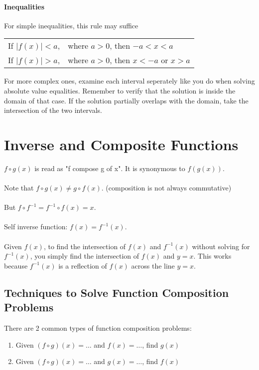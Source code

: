 \documentclass{article}
\numberwithin{equation}{section}
\begin{document}
\paragraph{Inequalities}

For simple inequalities, this rule may suffice

\medskip

\begin{tabular}{l l}
	If $|f(x)| < a$, &where $a>0$, then $-a<x<a$ \\
	If $|f(x)| > a$, &where $a>0$, then $x<-a$ or $x>a$
\end{tabular}

\medskip

For more complex ones, examine each interval seperately like you do when solving absolute value equalities. Remember to verify that the solution is inside the domain of that case. If the solution partially overlaps with the domain, take the intersection of the two intervals.

\section{Inverse and Composite Functions}

$f \circ g(x)$ is read as "f compose g of x". It is synonymous to $f(g(x))$.
\\ \\
Note that $f \circ g(x) \ne g \circ f(x)$. (composition is not always commutative)
\\ \\
But $f \circ f^{-1} = f^{-1} \circ f(x) = x$.
\\ \\
Self inverse function: $f(x) = f^{-1}(x)$.
\\ \\
Given $f(x)$, to find the intersection of $f(x)$ and $f^{-1}(x)$ without solving for $f^{-1}(x)$, you simply find the intersection of $f(x)$ and $y=x$. This works because $f^{-1}(x)$ is a reflection of $f(x)$ across the line $y=x$.

\subsection{Techniques to Solve Function Composition Problems}

There are 2 common types of function composition problems:

\begin{enumerate}
	\item Given $(f \circ g)(x) = \dotso$ and $f(x)= \dotso$, find $g(x)$
	\item Given $(f \circ g)(x) = \dotso$ and $g(x)= \dotso$, find $f(x)$
\end{enumerate}
\end{document}
